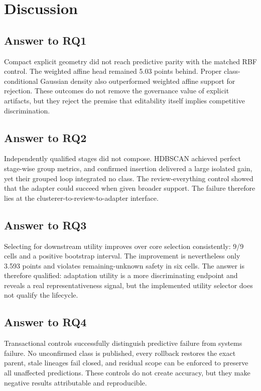 \documentclass[12pt,oneside]{report}
\begin{document}
\chapter{Discussion}

\section{Answer to RQ1}

Compact explicit geometry did not reach predictive parity with the matched RBF
control. The weighted affine head remained 5.03 points behind. Proper
class-conditional Gaussian density also outperformed weighted affine support
for rejection. These outcomes do not remove the governance value of explicit
artifacts, but they reject the premise that editability itself implies
competitive discrimination.

\section{Answer to RQ2}

Independently qualified stages did not compose. HDBSCAN achieved perfect
stage-wise group metrics, and confirmed insertion delivered a large isolated
gain, yet their grouped loop integrated no class. The review-everything control
showed that the adapter could succeed when given broader support. The failure
therefore lies at the clusterer-to-review-to-adapter interface.

\section{Answer to RQ3}

Selecting for downstream utility improves over core selection consistently:
9/9 cells and a positive bootstrap interval. The improvement is nevertheless
only 3.593 points and violates remaining-unknown safety in six cells. The
answer is therefore qualified: adaptation utility is a more discriminating
endpoint and reveals a real representativeness signal, but the implemented
utility selector does not qualify the lifecycle.

\section{Answer to RQ4}

Transactional controls successfully distinguish predictive failure from
systems failure. No unconfirmed class is published, every rollback restores
the exact parent, stale lineages fail closed, and residual scope can be enforced
to preserve all unaffected predictions. These controls do not create accuracy,
but they make negative results attributable and reproducible.
\end{document}
